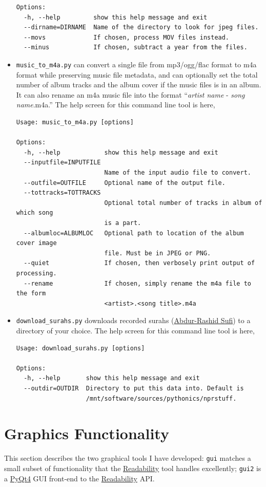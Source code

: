 \documentclass[]{article}
\begin{document}
\begin{itemize}
\begin{verbatim}
Options:
  -h, --help         show this help message and exit
  --dirname=DIRNAME  Name of the directory to look for jpeg files.
  --movs             If chosen, process MOV files instead.
  --minus            If chosen, subtract a year from the files.
\end{verbatim}
 
 \item {\verb|music_to_m4a.py|} can convert a single file from mp3/ogg/flac format to m4a format while preserving music file metadata, and can optionally set the total number of album tracks and the album cover if the music files is in an album. It can also rename an m4a music file into the format ``\textit{artist name} - \textit{song name}.m4a.'' The help screen for this command line tool is here,
\begin{verbatim}
Usage: music_to_m4a.py [options]

Options:
  -h, --help            show this help message and exit
  --inputfile=INPUTFILE
                        Name of the input audio file to convert.
  --outfile=OUTFILE     Optional name of the output file.
  --tottracks=TOTTRACKS
                        Optional total number of tracks in album of which song
                        is a part.
  --albumloc=ALBUMLOC   Optional path to location of the album cover image
                        file. Must be in JPEG or PNG.
  --quiet               If chosen, then verbosely print output of processing.
  --rename              If chosen, simply rename the m4a file to the form
                        <artist>.<song title>.m4a
\end{verbatim}
 
 \item {\verb|download_surahs.py|} downloads recorded surahs (\href{http://quranicaudio.com/quran/109}{Abdur-Rashid Sufi}) to a directory of your choice. The help screen for this command line tool is here,
\begin{verbatim}
Usage: download_surahs.py [options]

Options:
  -h, --help       show this help message and exit
  --outdir=OUTDIR  Directory to put this data into. Default is
                   /mnt/software/sources/pythonics/nprstuff.
\end{verbatim}
\end{itemize}

\section{Graphics Functionality}
This section describes the two graphical tools I have developed:
{\verb|gui|} matches a small subset of functionality that the
\href{https://www.readability.com}{Readability} tool handles
excellently; {\verb|gui2|} is a
\href{https://www.riverbankcomputing.com/software/pyqt/download}{PyQt4}
GUI front-end to the \href{https://www.readability.com}{Readability}
API.
\end{document}
